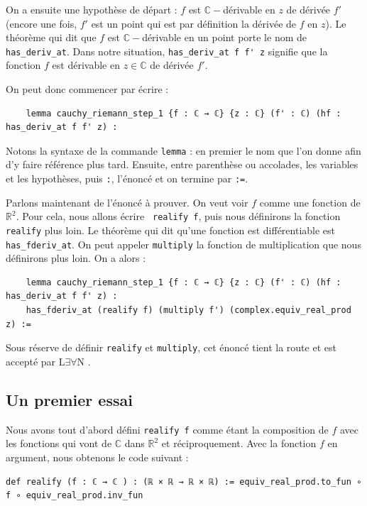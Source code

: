 \documentclass[a4paper, 11pt, twoside]{report}
\newcommand\R{\mathbb{R}}
\newcommand\C{\mathbb{C}}
\newcommand{\LEAN}{L$\exists\forall$N }
\begin{document}
On a ensuite une hypothèse de départ : $f$ est $\C-$dérivable en $z$ de dérivée $f'$ (encore une fois, $f'$ est un point qui est par définition la dérivée de $f$ en $z$). Le théorème qui dit que $f$ est $\C-$dérivable en un point porte le nom de \verb|has_deriv_at|. Dans notre situation, \verb|has_deriv_at f f' z| signifie que la fonction $f$ est dérivable en $z\in\C$ de dérivée $f'$.

On peut donc commencer par écrire :

\begin{lstlisting}
	lemma cauchy_riemann_step_1 {f : ℂ → ℂ} {z : ℂ} (f' : ℂ) (hf : has_deriv_at f f' z) : 
\end{lstlisting}
	
	Notons la syntaxe de la commande \verb|lemma| : en premier le nom que l'on donne afin d'y faire référence plus tard. Ensuite, entre parenthèse ou accolades, les variables et les hypothèses, puis \verb|:|, l'énoncé et on termine par \verb|:=|.	
	
	\medskip
	
	Parlons maintenant de l'énoncé à prouver. On veut voir $f$ comme une fonction de $\R^2$. Pour cela, nous allons écrire \verb| realify f|, puis nous définirons la fonction \verb|realify| plus loin. Le théorème qui dit qu'une fonction est différentiable est \verb|has_fderiv_at|. On peut appeler \verb|multiply| la fonction de multiplication que nous définirons plus loin. On a alors :
	
\begin{lstlisting}
	lemma cauchy_riemann_step_1 {f : ℂ → ℂ} {z : ℂ} (f' : ℂ) (hf : has_deriv_at f f' z) : 
	has_fderiv_at (realify f) (multiply f') (complex.equiv_real_prod z) :=
\end{lstlisting}
	
	Sous réserve de définir \verb|realify| et \verb|multiply|, cet énoncé tient la route et est accepté par \LEAN.
	
\subsection{Un premier essai}
	
Nous avons tout d'abord défini \verb|realify f| comme étant la composition de $f$ avec les fonctions qui vont de $\C$ dans $\R^2$ et réciproquement. Avec la fonction $f$ en argument, nous obtenons le code suivant :

\begin{lstlisting}
def realify (f : ℂ → ℂ ) : (ℝ × ℝ → ℝ × ℝ) := equiv_real_prod.to_fun ∘ f ∘ equiv_real_prod.inv_fun
\end{lstlisting}
	
\end{document}

